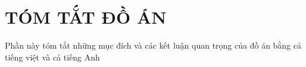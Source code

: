 \section*{TÓM TẮT ĐỒ ÁN}
Phần này tóm tắt những mục đích và các kết luận quan trọng của đồ án bằng cả tiếng việt và cả tiếng Anh
\cleardoublepage